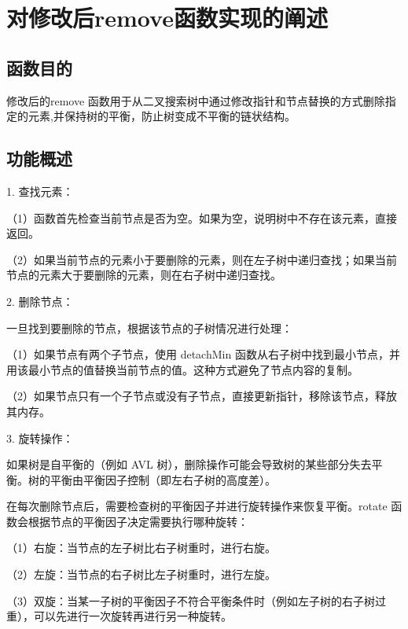 \documentclass[UTF8]{ctexart}
\begin{document}
\pagestyle{fancy}
\fancyhead{}


\section{对修改后remove函数实现的阐述}  

\subsection{函数目的}
修改后的remove 函数用于从二叉搜索树中通过修改指针和节点替换的方式删除指定的元素,并保持树的平衡，防止树变成不平衡的链状结构。

\subsection{功能概述}

1. 查找元素：

（1）函数首先检查当前节点是否为空。如果为空，说明树中不存在该元素，直接返回。

（2）如果当前节点的元素小于要删除的元素，则在左子树中递归查找；如果当前节点的元素大于要删除的元素，则在右子树中递归查找。

2.  删除节点：

一旦找到要删除的节点，根据该节点的子树情况进行处理：

（1）如果节点有两个子节点，使用 detachMin 函数从右子树中找到最小节点，并用该最小节点的值替换当前节点的值。这种方式避免了节点内容的复制。

（2）如果节点只有一个子节点或没有子节点，直接更新指针，移除该节点，释放其内存。

3.  旋转操作：

如果树是自平衡的（例如 AVL 树），删除操作可能会导致树的某些部分失去平衡。树的平衡由平衡因子控制（即左右子树的高度差）。

在每次删除节点后，需要检查树的平衡因子并进行旋转操作来恢复平衡。rotate 函数会根据节点的平衡因子决定需要执行哪种旋转：

（1）右旋：当节点的左子树比右子树重时，进行右旋。

（2）左旋：当节点的右子树比左子树重时，进行左旋。

（3）双旋：当某一子树的平衡因子不符合平衡条件时（例如左子树的右子树过重），可以先进行一次旋转再进行另一种旋转。
\end{document}
